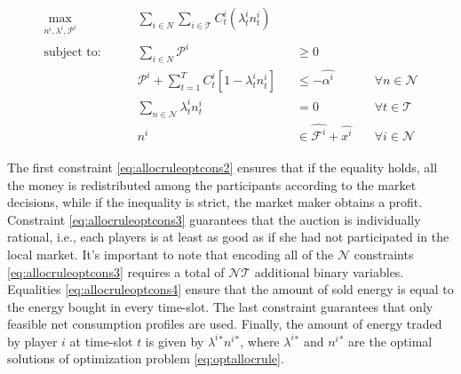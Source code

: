 \documentclass[runningheads]{llncs}
\newcommand{\li}[1][]{x^i_{#1}}
\newcommand{\oi}[1][]{n^i_{#1}}
\newcommand{\ci}[1][]{C^i_{#1}}
\newcommand{\fsi}{\mathcal{F}^i}
\newcommand{\pri}[1][]{\lambda^i_{#1}}
\newcommand{\gaini}[1][]{\mathcal{P}^i_{#1}}
\newcommand{\resi}{\alpha^i}
\newcommand{\N}{\mathcal{N}}
\newcommand{\T}{\mathcal{T}}
\begin{document}
\begin{subequations}
\begin{alignat}{3}
\max_{\oi, \pri, \gaini }              &\quad&  \sum_{i \in N} \sum_{i \in \T} \ci[t]\left( \pri[t]\oi[t] \right)  &&          & \label{eq:optallocrule} \\
\text{subject to: } 
                    &\quad&  \sum_{i \in N} \gaini    && \geq 0    &\quad %
                    \label{eq:allocruleoptcons2} \\
                    &\quad& \gaini + \sum_{t=1}^T \ci[t]\left[ 1 - \pri[t]\oi[t] \right]   &&  \leq -\hat{\resi}  &\quad \forall n \in \N \label{eq:allocruleoptcons3} \\
                    &\quad& \sum_{n \in \N} \pri[t]\oi[t] &&  = 0  &\quad \forall t \in \T \label{eq:allocruleoptcons4} \\
                    &\quad&  \oi   && \in \hat{\fsi} + \hat{\li}   &\quad \forall i \in \N \label{eq:allocruleoptcons5}
\end{alignat}
\end{subequations}



The first constraint \eqref{eq:allocruleoptcons2} ensures that if the equality holds, all the money is redistributed among the participants according to the market decisions, while if the inequality is strict, the market maker obtains a profit. Constraint \eqref{eq:allocruleoptcons3} guarantees that the auction is individually rational, i.e., each players is at least as good as if she had not participated in the local market. It's important to note that encoding all of the $\N$ constraints \eqref{eq:allocruleoptcons3} requires a total of $\N\T$ additional binary variables. Equalities \eqref{eq:allocruleoptcons4} ensure that the amount of sold energy is equal to the energy bought in every time-slot. The last constraint guarantees that only feasible net consumption profiles are used. 
Finally, the amount of energy traded by player $i$ at time-slot $t$ is given by $\pri^*\oi^*$, where $\pri^*$ and $\oi^*$ are the optimal solutions of optimization problem \eqref{eq:optallocrule}. 

\end{document}

